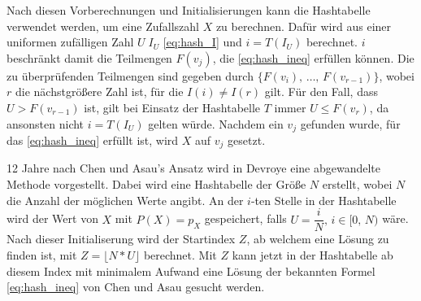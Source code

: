 Nach diesen Vorberechnungen und Initialisierungen kann die Hashtabelle verwendet werden, um eine Zufallszahl $X$ zu berechnen. 
Dafür wird aus einer uniformen zufälligen Zahl $U\; I_U$ \eqref{eq:hash_I} und $i = T(I_U)$ berechnet. $i$ beschränkt 
damit die Teilmengen $F(v_j)$, die \eqref{eq:hash_ineq} erfüllen können. Die zu überprüfenden Teilmengen sind gegeben 
durch $\{F(v_i),\, \dots, \, F(v_{r-1})\}$, wobei $r$ die nächstgrößere Zahl ist, für die $I(i) \neq I(r)$ gilt. 
Für den Fall, dass $U > F(v_{r-1})$ ist, gilt bei Einsatz der Hashtabelle $T$ immer $U \leq F(v_r)$, da ansonsten nicht $i = T(I_U)$ 
gelten würde. Nachdem ein $v_j$ gefunden wurde, für das \eqref{eq:hash_ineq} erfüllt ist, wird $X$ auf $v_j$ gesetzt.

12 Jahre nach Chen und Asau's Ansatz wird in Devroye \cite{devroye-non_uniform_random_variate-1986} eine abgewandelte Methode 
vorgestellt. Dabei wird eine Hashtabelle der Größe $N$ erstellt, wobei $N$ die Anzahl der möglichen Werte angibt. An der $i$-ten 
Stelle in der Hashtabelle wird der Wert von $X$ mit $P(X) = p_X$ gespeichert, falls $U = \dfrac{i}{N},\, i \in [0,\, N)$ wäre. Nach 
dieser Initialiserung wird der Startindex $Z$, ab welchem eine Lösung zu finden ist, mit $Z = \lfloor N * U \rfloor$ berechnet. 
Mit $Z$ kann jetzt in der Hashtabelle ab diesem Index mit minimalem Aufwand eine Lösung der bekannten Formel \eqref{eq:hash_ineq} von Chen 
und Asau gesucht werden. 